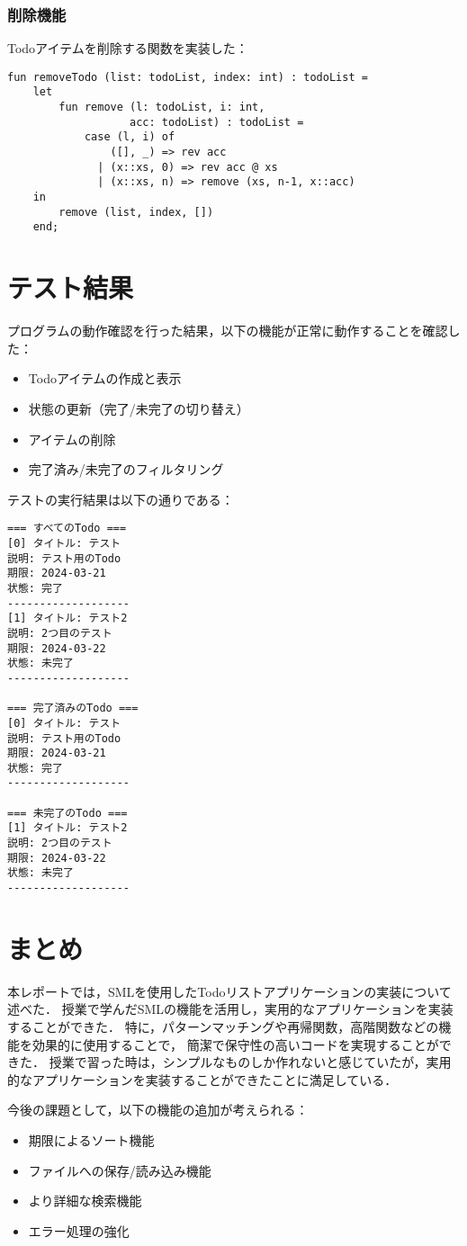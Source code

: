 \documentclass[autodetect-engine,
dvi=dvipdfmx,ja=standard,
               a4j,11pt]{bxjsarticle}
\begin{document}
\subsubsection{削除機能}
Todoアイテムを削除する関数を実装した：

\begin{verbatim}
fun removeTodo (list: todoList, index: int) : todoList =
    let
        fun remove (l: todoList, i: int, 
                   acc: todoList) : todoList =
            case (l, i) of
                ([], _) => rev acc
              | (x::xs, 0) => rev acc @ xs
              | (x::xs, n) => remove (xs, n-1, x::acc)
    in
        remove (list, index, [])
    end;
\end{verbatim}

\section{テスト結果}
プログラムの動作確認を行った結果，以下の機能が正常に動作することを確認した：

\begin{itemize}
    \item Todoアイテムの作成と表示
    \item 状態の更新（完了/未完了の切り替え）
    \item アイテムの削除
    \item 完了済み/未完了のフィルタリング
\end{itemize}

テストの実行結果は以下の通りである：

\begin{verbatim}
=== すべてのTodo ===
[0] タイトル: テスト
説明: テスト用のTodo
期限: 2024-03-21
状態: 完了
-------------------
[1] タイトル: テスト2
説明: 2つ目のテスト
期限: 2024-03-22
状態: 未完了
-------------------

=== 完了済みのTodo ===
[0] タイトル: テスト
説明: テスト用のTodo
期限: 2024-03-21
状態: 完了
-------------------

=== 未完了のTodo ===
[1] タイトル: テスト2
説明: 2つ目のテスト
期限: 2024-03-22
状態: 未完了
-------------------
\end{verbatim}

\section{まとめ}
本レポートでは，SMLを使用したTodoリストアプリケーションの実装について述べた．
授業で学んだSMLの機能を活用し，実用的なアプリケーションを実装することができた．
特に，パターンマッチングや再帰関数，高階関数などの機能を効果的に使用することで，
簡潔で保守性の高いコードを実現することができた．
授業で習った時は，シンプルなものしか作れないと感じていたが，実用的なアプリケーションを実装することができたことに満足している．

今後の課題として，以下の機能の追加が考えられる：
\begin{itemize}
    \item 期限によるソート機能
    \item ファイルへの保存/読み込み機能
    \item より詳細な検索機能
    \item エラー処理の強化
\end{itemize}
\end{document}
